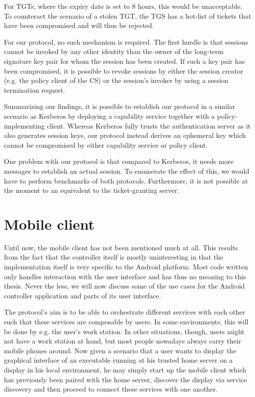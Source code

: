 For TGTs, where the expiry date is set to 8 hours, this would be unacceptable.
To counteract the scenario of a stolen TGT, the TGS has a hot-list of tickets that have been compromised and will thus be rejected.

For our protocol, no such mechanism is required.
The first hurdle is that sessions cannot be invoked by any other identity than the owner of the long-term signature key pair for whom the session has been created.
If such a key pair has been compromised, it is possible to revoke sessions by either the session creator (e.g. the policy client of the CS) or the session's invoker by using a session termination request.

\bigskip

Summarizing our findings, it is possible to establish our protocol in a similar scenario as Kerberos by deploying a capability service together with a policy-implementing client.
Whereas Kerberos fully trusts the authentication server as it also generates session keys, our protocol instead derives an ephemeral key which cannot be compromised by either capability service or policy client.

One problem with our protocol is that compared to Kerberos, it needs more messages to establish an actual session.
To enumerate the effect of this, we would have to perform benchmarks of both protocols.
Furthermore, it is not possible at the moment to an equivalent to the ticket-granting server.

\section{Mobile client}

Until now, the mobile client has not been mentioned much at all.
This results from the fact that the controller itself is mostly uninteresting in that the implementation itself is very specific to the Android platform.
Most code written only handles interaction with the user interface and has thus no meaning to this thesis.
Never the less, we will now discuss some of the use cases for the Android controller application and parts of its user interface.

The protocol's aim is to be able to orchestrate different services with each other such that these services are composable by users.
In some environments, this will be done by e.g. the user's work station.
In other situations, though, users might not have a work station at hand, but most people nowadays always carry their mobile phones around.
Now given a scenario that a user wants to display the graphical interface of an executable running at his trusted home server on a display in his local environment, he may simply start up the mobile client which has previously been paired with the home server, discover the display via service discovery and then proceed to connect these services with one another.

